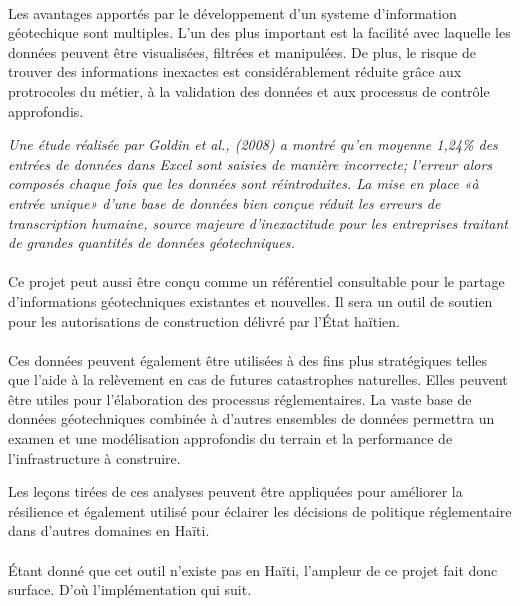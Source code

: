 \paragraph{}
Les avantages apportés par le développement d'un systeme d'information géotechique
sont multiples.
L'un des plus important est la facilité avec laquelle les données 
peuvent être visualisées, filtrées et manipulées.
De plus, le risque de trouver  des informations inexactes est considérablement
réduite grâce aux protrocoles du métier, à la validation des données et aux processus
de contrôle approfondis.

\textit{ Une 
étude réalisée par Goldin et al.,
(2008) a montré qu'en moyenne 1,24\% des entrées de données dans Excel 
sont saisies de manière incorrecte; l'erreur alors
composés chaque fois que les données sont réintroduites. La mise en place 
«à entrée unique» d’une base de données bien conçue réduit les erreurs de 
transcription humaine, source majeure d’inexactitude pour les entreprises
traitant de grandes quantités de données géotechniques.}
\cite{keen2015development}
\paragraph{}
Ce projet peut aussi être
conçu comme un référentiel consultable pour le partage d'informations 
géotechniques existantes et nouvelles.
Il sera un outil de soutien pour les autorisations de construction délivré par l'État haïtien.
\paragraph{}
\par
Ces données peuvent également être utilisées à des fins plus stratégiques telles que l'aide à la
relèvement en cas de futures catastrophes naturelles.
Elles peuvent être utiles pour  l'élaboration des processus réglementaires.
La vaste base de données géotechniques
combinée à d'autres ensembles de données permettra un examen et une modélisation approfondis du terrain
et la performance de l'infrastructure à construire. 
\par
Les leçons tirées de ces analyses peuvent être appliquées pour
améliorer la résilience et également utilisé pour éclairer les 
décisions de politique réglementaire dans d'autres domaines en Haïti.
\paragraph{}
Étant donné que cet outil n'existe pas 
en Haïti, l'ampleur de ce projet fait donc surface.
D'où l'implémentation qui suit.

